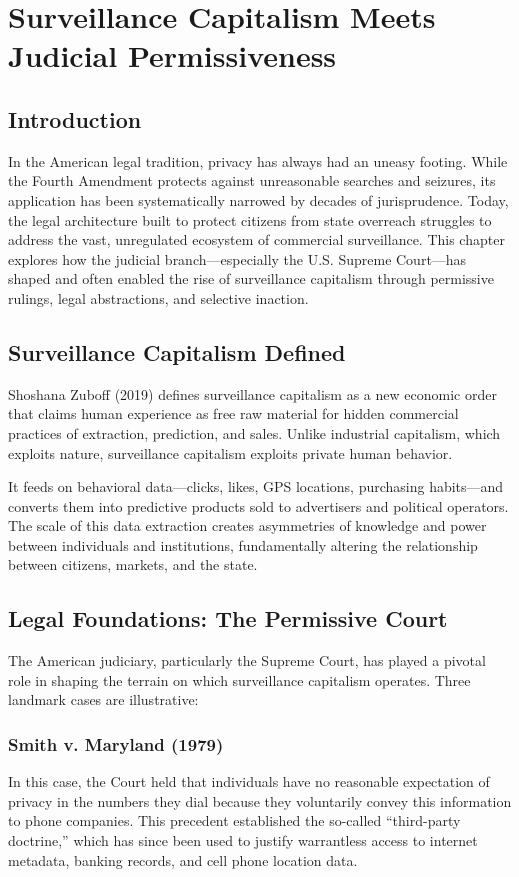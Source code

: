 \chapter{Surveillance Capitalism Meets Judicial Permissiveness}

\section*{Introduction}
In the American legal tradition, privacy has always had an uneasy footing. While the Fourth Amendment protects against unreasonable searches and seizures, its application has been systematically narrowed by decades of jurisprudence. Today, the legal architecture built to protect citizens from state overreach struggles to address the vast, unregulated ecosystem of commercial surveillance. This chapter explores how the judicial branch—especially the U.S. Supreme Court—has shaped and often enabled the rise of surveillance capitalism through permissive rulings, legal abstractions, and selective inaction.

\section{Surveillance Capitalism Defined}
Shoshana Zuboff (2019) defines surveillance capitalism as a new economic order that claims human experience as free raw material for hidden commercial practices of extraction, prediction, and sales. Unlike industrial capitalism, which exploits nature, surveillance capitalism exploits private human behavior.

It feeds on behavioral data—clicks, likes, GPS locations, purchasing habits—and converts them into predictive products sold to advertisers and political operators. The scale of this data extraction creates asymmetries of knowledge and power between individuals and institutions, fundamentally altering the relationship between citizens, markets, and the state.

\section{Legal Foundations: The Permissive Court}
The American judiciary, particularly the Supreme Court, has played a pivotal role in shaping the terrain on which surveillance capitalism operates. Three landmark cases are illustrative:

\subsection*{Smith v. Maryland (1979)}
In this case, the Court held that individuals have no reasonable expectation of privacy in the numbers they dial because they voluntarily convey this information to phone companies. This precedent established the so-called “third-party doctrine,” which has since been used to justify warrantless access to internet metadata, banking records, and cell phone location data.

